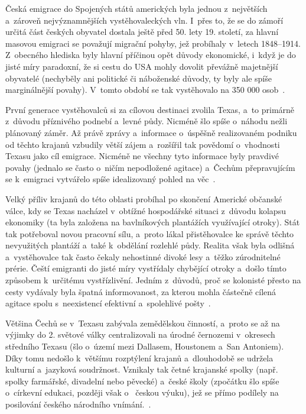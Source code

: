 Česká emigrace do Spojených států amerických byla jednou z~největších a~zároveň nejvýznamnějších vystěhovaleckých vln. I~přes to, že se do zámoří určitá část českých obyvatel dostala ještě před 50. lety 19. století, za hlavní masovou emigraci se považují migrační pohyby, jež probíhaly v~letech 1848--1914. Z~obecného hlediska byly hlavní příčinou opět důvody ekonomické, i~když je do jisté míry paradoxní, že si cestu do USA mohly dovolit převážně majetnější obyvatelé (nechyběly ani politické či náboženské důvody, ty byly ale spíše marginálnější povahy). V~tomto období se tak vystěhovalo na 350 000 osob~\parencite{Vaculik2009a}.

První generace vystěhovalců si za cílovou destinaci zvolila Texas, a~to primárně z~důvodu příznivého podnebí a~levné půdy. Nicméně šlo spíše o~náhodu nežli plánovaný záměr. Až právě zprávy a~informace o~úspěšně realizovaném podniku od těchto krajanů vzbudily větší zájem a~rozšířil tak povědomí o~vhodnosti Texasu jako cíl emigrace. Nicméně ne všechny tyto informace byly pravdivé povahy (jednalo se často o~ničím nepodložené agitace) a~Čechům přepravujícím se k~emigraci vytvářelo spíše idealizovaný pohled na věc~\parencite{Eckertova2004}.

Velký příliv krajanů do této oblasti probíhal po skončení Americké občanské válce, kdy se Texas nacházel v~obtížné hospodářské situaci z~důvodu kolapsu ekonomiky (ta byla založena na bavlníkových plantážích využívající otroky). Stát tak potřeboval novou pracovní sílu, a~proto lákal přistěhovalce ke správě těchto nevyužitých plantáží a~také k~obdělání rozlehlé půdy. Realita však byla odlišná a~vystěhovalce tak často čekaly nehostinné divoké lesy a~těžko zúrodnitelné prérie. Čeští emigranti do jisté míry vystřídaly chybějící otroky a~došlo tímto způsobem k~určitému vystřízlivění. Jedním z~důvodů, proč se kolonisté přesto na cesty vydávaly byla špatná informovanost, za kterou mohla částečně cílená agitace spolu s~neexistencí efektivní a~spolehlivé pošty~\parencite{Eckertova2004}.

Většina Čechů se v~Texasu zabývala zemědělskou činností, a~proto se až na výjimky do 2. světové války centralizovali na úrodné černozemi v~okresech středního Texasu (šlo o~území mezi Dallasem, Houstonem a~San Antoniem). Díky tomu nedošlo k~většímu rozptýlení krajanů a~dlouhodobě se udržela kulturní a~jazyková soudržnost. Vznikaly tak četné krajanské spolky (např. spolky farmářské, divadelní nebo pěvecké) a~české školy (zpočátku šlo spíše o~církevní edukaci, později však o~ českou výuku), jež se přímo podílely na posilování českého národního vnímání.~\parencite{Eckertova2004}.

